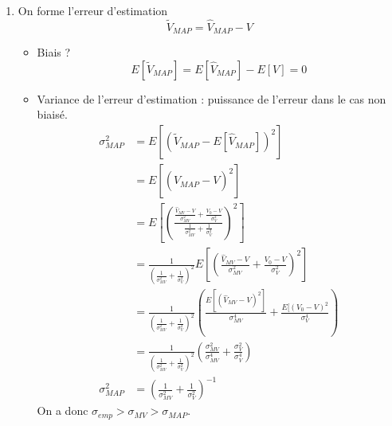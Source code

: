 \documentclass[main.tex]{subfiles}
\begin{document}
\begin{enumerate}
\item On forme l'erreur d'estimation 
\[ \tilde{V}_{MAP} = \hat{V}_{MAP} - V \]

\begin{itemize}\setlength{\itemsep}{10mm}
\item Biais ? 
\[ E[\tilde{V}_{MAP}] = E[\hat{V}_{MAP}] - E[V] = 0 \]

\item Variance de l'erreur d'estimation : puissance de l'erreur dans le cas non biaisé.
\begin{align*}
\sigma_{MAP}^2 & = E[ (\tilde{V}_{MAP} - E[\hat{V}_{MAP}])^2] \\
& = E [(\hat{V}_{MAP} - V)^2] \\
& = E [ (\frac{\frac{\hat{V}_{MV}-V}{\sigma_{MV}^2} + \frac{V_0-V}{\sigma_V^2}}{\frac{1}{\sigma_{MV}^2} + \frac{1}{\sigma_V^2}})^2]\\
& = \frac{1}{(\frac{1}{\sigma_{MV}^2} + \frac{1}{\sigma_V^2})^2} E [(\frac{\hat{V}_{MV}-V}{\sigma_{MV}^2} + \frac{V_0-V}{\sigma_V^2})^2] \\
& = \frac{1}{(\frac{1}{\sigma_{MV}^2} + \frac{1}{\sigma_V^2})^2}( \frac{E[(\hat{V}_{MV}-V)^2]}{\sigma_{MV}^4} + \frac{E[(V_0-V)^2}{\sigma_V^4}) \\
& = \frac{1}{(\frac{1}{\sigma_{MV}^2} + \frac{1}{\sigma_V^2})^2}( \frac{\sigma_{MV}^2}{\sigma_{MV}^4} + \frac{\sigma_V^2}{\sigma_V^4}) \\
\sigma_{MAP}^2 & = (\frac{1}{\sigma_{MV}^2} + \frac{1}{\sigma_V^2})^{-1}
\end{align*}
On a donc $ \sigma_{emp} > \sigma_{MV} > \sigma_{MAP}$.
\end{itemize}

\end{enumerate}
\end{document}
